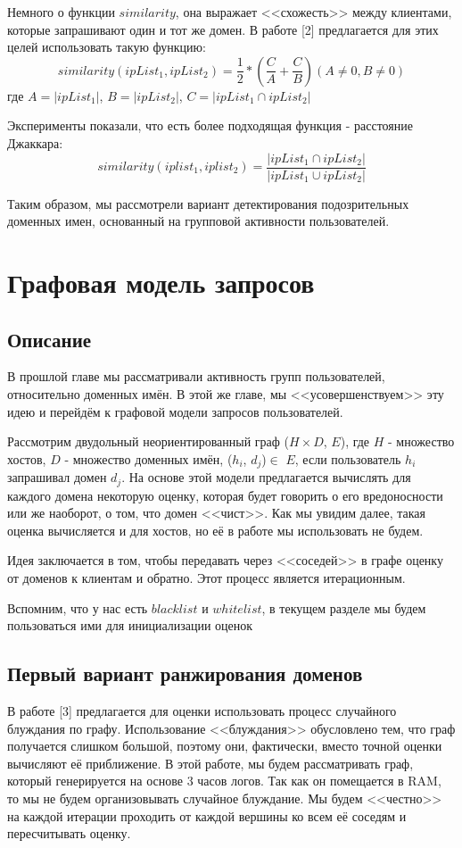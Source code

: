 \documentclass[14pt]{extreport} %
\begin{document}
	
Немного о функции $similarity$, она выражает <<схожесть>> между клиентами, которые запрашивают один и тот же домен. В работе [2] предлагается для этих целей использовать такую функцию: 
\begin{equation}
	\label{eq:ga-orig}
	similarity(ipList_1, ipList_2) = \frac{1}{2} * (\frac{C}{A} + \frac{C}{B}) (A\ne0, B\ne0)
\end{equation} 
где $A = |ipList_1|$, $B = |ipList_2|$, $C = |ipList_1\cap ipList_2|$
	
Эксперименты показали, что есть более подходящая функция - расстояние Джаккара: 
\begin{equation}
	\label{eq:ga-jacc}
	similarity(iplist_1, iplist_2) = \frac{|ipList_1\cap ipList_2|}{|ipList_1\cup ipList_2|}
\end{equation} 
	
Таким образом, мы рассмотрели вариант детектирования подозрительных доменных имен, основанный на групповой активности пользователей.
	
\chapter{Графовая модель запросов}
\label{chap:graph}
\section{Описание}
В прошлой главе мы рассматривали активность групп пользователей, относительно доменных имён. В этой же главе, мы <<усовершенствуем>> эту идею и перейдём к графовой модели запросов пользователей.
	
Рассмотрим двудольный неориентированный граф ($H\times D$, $E$), где $H$ - множество хостов, $D$ - множество доменных имён, ($h_i$, $d_j$)$\in$ $E$, если пользователь $h_i$ запрашивал домен $d_j$. 
На основе этой модели предлагается вычислять для каждого домена некоторую оценку, которая будет говорить о его вредоносности или же наоборот, о том, что домен <<чист>>. Как мы увидим далее, такая оценка вычисляется и для хостов, но её в работе мы использовать не будем.

Идея заключается в том, чтобы передавать через <<соседей>> в графе оценку от доменов к клиентам и обратно. Этот процесс является итерационным.
	
			
Вспомним, что у нас есть $blacklist$ и $whitelist$, в текущем разделе мы будем пользоваться ими для инициализации оценок
\section{Первый вариант ранжирования доменов}
В работе [3] предлагается для оценки использовать процесс случайного блуждания по графу. Использование <<блуждания>> обусловлено тем, что граф получается слишком большой, поэтому они, фактически, вместо точной оценки вычисляют её приближение. В этой работе, мы будем рассматривать граф, который генерируется на основе 3 часов логов. Так как он помещается в RAM, то мы не будем организовывать случайное блуждание. Мы будем <<честно>> на каждой итерации проходить от каждой вершины ко всем её соседям и пересчитывать оценку.
\end{document}
